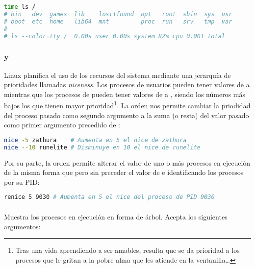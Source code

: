 \begin{lstlisting}[language=Bash]
time ls /
# bin   dev  games  lib    lost+found  opt   root  sbin  sys  usr
# boot  etc  home   lib64  mnt         proc  run   srv   tmp  var
#
# ls --color=tty /  0.00s user 0.00s system 82% cpu 0.001 total
\end{lstlisting}

\subsubsection{ y }

Linux planifica el uso de los recursos del sistema mediante una jerarquía de prioridades llamadas \emph{niceness}.
Los procesos de usuarios pueden tener valores  de  a  mientras que los procesos de  pueden tener valores de  a , siendo los números más bajos los que tienen mayor prioridad\footnote{Tras una vida aprendiendo a ser amables, resulta que se da prioridad a los procesos que le gritan a la pobre alma que les atiende en la ventanilla\ldots}.
La orden  nos permite cambiar la priodidad del proceso pasado como segundo argumento a la suma (o resta) del valor pasado como primer argumento precedido de \code{-}:

\begin{lstlisting}[language=Bash]
nice -5 zathura    # Aumenta en 5 el nice de zathura
nice --10 runelite # Disminuye en 10 el nice de runelite
\end{lstlisting}

Por su parte, la orden  permite alterar el valor de uno o más procesos en ejecución de la misma forma que  pero sin preceder el valor de \code{-} e identificando los procesos por su PID\@:

\begin{lstlisting}[language=Bash]
renice 5 9030 # Aumenta en 5 el nice del proceso de PID 9030
\end{lstlisting}

\subsubsection{}

Muestra los procesos en ejecución en forma de árbol.
Acepta los siguientes argumentos:

